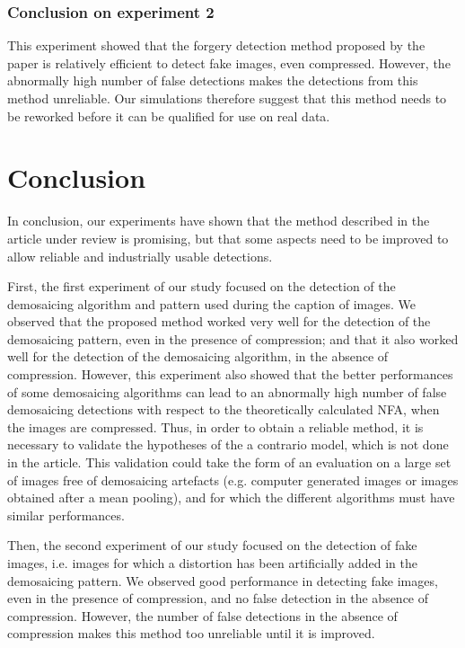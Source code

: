 \documentclass[sigconf, nonacm]{acmart}
\begin{document}
\subsubsection{Conclusion on experiment 2}

This experiment showed that the forgery detection method proposed by the paper is relatively efficient to detect fake images, even compressed. However, the abnormally high number of false detections makes the detections from this method unreliable. Our simulations therefore suggest that this method needs to be reworked before it can be qualified for use on real data.

\section{Conclusion}

In conclusion, our experiments have shown that the method described in the article under review is promising, but that some aspects need to be improved to allow reliable and industrially usable detections. 

First, the first experiment of our study focused on the detection of the demosaicing algorithm and pattern used during the caption of images. We observed that the proposed method worked very well for the detection of the demosaicing pattern, even in the presence of compression; and that it also worked well for the detection of the demosaicing algorithm, in the absence of compression. However, this experiment also showed that the better performances of some demosaicing algorithms can lead to an abnormally high number of false demosaicing detections with respect to the theoretically calculated NFA, when the images are compressed. Thus, in order to obtain a reliable method, it is necessary to validate the hypotheses of the a contrario model, which is not done in the article. This validation could take the form of an evaluation on a large set of images free of demosaicing artefacts (e.g. computer generated images or images obtained after a mean pooling), and for which the different algorithms must have similar performances.

Then, the second experiment of our study focused on the detection of fake images, i.e. images for which a distortion has been artificially added in the demosaicing pattern. We observed good performance in detecting fake images, even in the presence of compression, and no false detection in the absence of compression. However, the number of false detections in the absence of compression makes this method too unreliable until it is improved.



\end{document}
